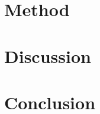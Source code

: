 \documentclass[a4paper,fleqn]{cas-sc}
\begin{document}
\section{Method}\label{method}


\section{Discussion}\label{disc}


\section{Conclusion}\label{con}







\end{document}
